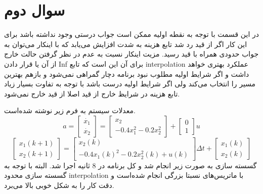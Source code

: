 \documentclass[12 pt]{article}
\begin{document}
\section*{سوال دوم}
در این قسمت با توجه به نقطه اولیه ممکن است جواب درستی وجود نداشته باشد برای این کار اگر از قید رد شد تابع هزینه به شدت افزایش می‌یابد که با اینکار می‌توان به جواب حدودی همراه با قید رسید. مزیت اینکار نسبت به عدم در نظر گرفتن حالت خارج از آن یا قرار دادن Inf برای آن این است که تابع interpolation عملکرد بهتری خواهد داشت و اگر شرایط اولیه مطلوب نبود برنامه دچار گمراهی نمی‌شود و بازهم بهترین  مسیر را انتخاب می‌کند ولی اگر شرایط اولیه درست باشد با توجه به تفاوت بسیار زیاد تابع هزینه‌ در شرایظ خارج از قید اصلا از قید خارج نمی‌شود.

معدلات سیستم به فرم زیر نوشته شده‌است.
$$
a = \begin{bmatrix}
	\dot{x_1}\\
	\dot{x_2}
\end{bmatrix} = \begin{bmatrix}
	x_2\\
	-0.4x_1^2 -0.2x_2^2
\end{bmatrix} + \begin{bmatrix}
	0\\
	1
\end{bmatrix}u
$$
$$
\begin{bmatrix}
	x_1(k+1)\\
	x_2(k+1)
\end{bmatrix} = \begin{bmatrix}
	x_2(k)\\
	-0.4x_1(k)^2 -0.2x_2^2(k) + u(k)
\end{bmatrix} \Delta t + \begin{bmatrix}
x_1(k)\\
x_2(k)
\end{bmatrix}
$$
گسسته سازی به صورت زیر انجام شد و کل برنامه در 8 ثانیه اجرا شد. البته با توجه به گسسته سازی محدود interpolation با ماتریس‌های نسبتا بزرگی انجام شده‌است و دقت کار را به شکل خوبی بالا می‌برد.
\end{document}

